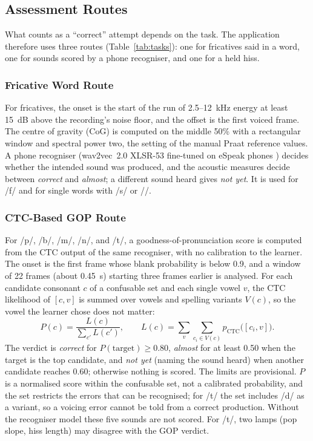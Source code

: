 \documentclass[engproc,article,submit,moreauthors]{Definitions/mdpi}
\newcommand{\ipa}[1]{/#1/}
\begin{document}
\subsection{Assessment Routes}
What counts as a ``correct'' attempt depends on the task. The application therefore uses three routes (Table~\ref{tab:tasks}): one for fricatives said in a word, one for sounds scored by a phone recogniser, and one for a held hiss.

\subsubsection{Fricative Word Route}
For fricatives, the onset is the start of the run of 2.5--12~kHz energy at least 15~dB above the recording's noise floor, and the offset is the first voiced frame. The centre of gravity (CoG) is computed on the middle 50\% with a rectangular window and spectral power two, the setting of the manual Praat reference values. A phone recogniser (wav2vec~2.0 XLSR-53 fine-tuned on eSpeak phones \cite{baevski2020,xu2022}) decides whether the intended sound was produced, and the acoustic measures decide between \textit{correct} and \textit{almost}; a different sound heard gives \textit{not yet}. It is used for \ipa{f} and for single words with \ipa{s} or \ipa{\textesh}.

\subsubsection{CTC-Based GOP Route}
For \ipa{p}, \ipa{b}, \ipa{m}, \ipa{n}, and \ipa{t\textesh}, a goodness-of-pronunciation score is computed from the CTC output of the same recogniser, with no calibration to the learner. The onset is the first frame whose blank probability is below 0.9, and a window of 22 frames (about 0.45~s) starting three frames earlier is analysed. For each candidate consonant $c$ of a confusable set and each single vowel $v$, the CTC likelihood of $[c,v]$ is summed over vowels and spelling variants $V(c)$, so the vowel the learner chose does not matter:
\begin{equation}
P(c)=\frac{L(c)}{\sum_{c'} L(c')},\qquad L(c)=\sum_{v}\sum_{c_i\in V(c)} p_{\mathrm{CTC}}\bigl([c_i,v]\bigr).
\end{equation}
The verdict is \textit{correct} for $P(\text{target})\geq0.80$, \textit{almost} for at least 0.50 when the target is the top candidate, and \textit{not yet} (naming the sound heard) when another candidate reaches 0.60; otherwise nothing is scored. The limits are provisional. $P$ is a normalised score within the confusable set, not a calibrated probability, and the set restricts the errors that can be recognised; for \ipa{t\textesh} the set includes \ipa{d\textyogh} as a variant, so a voicing error cannot be told from a correct production. Without the recogniser model these five sounds are not scored. For \ipa{t\textesh}, two lamps (pop slope, hiss length) may disagree with the GOP verdict.
\end{document}
